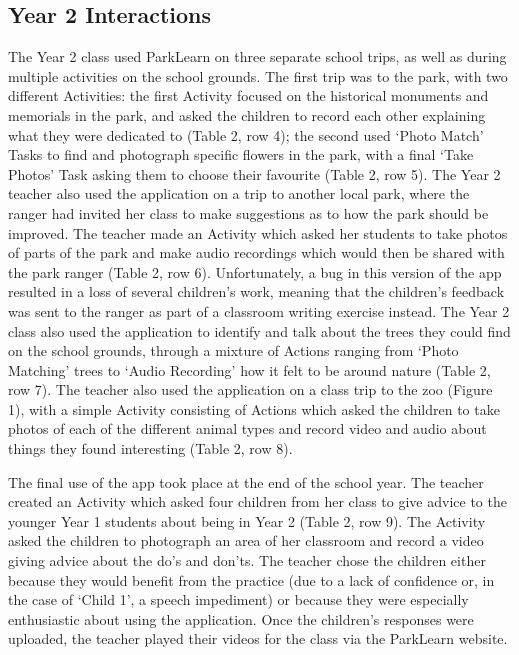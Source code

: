\subsection{Year 2 Interactions}

The Year 2 class used ParkLearn on three separate school trips, as well as during multiple activities on the school grounds. The first trip was to the park, with two different Activities: the first Activity focused on the historical monuments and memorials in the park, and asked the children to record each other explaining what they were dedicated to (Table 2, row 4); the second used ‘Photo Match’ Tasks to find and photograph specific flowers in the park, with a final ‘Take Photos’ Task asking them to choose their favourite (Table 2, row 5). The Year 2 teacher also used the application on a trip to another local park, where the ranger had invited her class to make suggestions as to how the park should be improved. The teacher made an Activity which asked her students to take photos of parts of the park and make audio recordings which would then be shared with the park ranger (Table 2, row 6). Unfortunately, a bug in this version of the app resulted in a loss of several children’s work, meaning that the children’s feedback was sent to the ranger as part of a classroom writing exercise instead. The Year 2 class also used the application to identify and talk about the trees they could find on the school grounds, through a mixture of Actions ranging from ‘Photo Matching’ trees to ‘Audio Recording’ how it felt to be around nature (Table 2, row 7). The teacher also used the application on a class trip to the zoo (Figure 1), with a simple Activity consisting of Actions which asked the children to take photos of each of the different animal types and record video and audio about things they found interesting (Table 2, row 8).

The final use of the app took place at the end of the school year. The teacher created an Activity which asked four children from her class to give advice to the younger Year 1 students about being in Year 2 (Table 2, row 9). The Activity asked the children to photograph an area of her classroom and record a video giving advice about the do’s and don’ts. The teacher chose the children either because they would benefit from the practice (due to a lack of confidence or, in the case of ‘Child 1’, a speech impediment) or because they were especially enthusiastic about using the application. Once the children’s responses were uploaded, the teacher played their videos for the class via the ParkLearn website.

